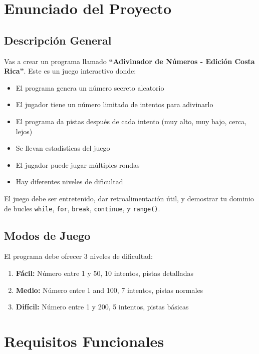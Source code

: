 \documentclass[12pt,a4paper]{article}
\begin{document}
\section{Enunciado del Proyecto}

\subsection{Descripción General}

Vas a crear un programa llamado \textbf{``Adivinador de Números - Edición Costa Rica''}. Este es un juego interactivo donde:

\begin{itemize}
    \item El programa genera un número secreto aleatorio
    \item El jugador tiene un número limitado de intentos para adivinarlo
    \item El programa da pistas después de cada intento (muy alto, muy bajo, cerca, lejos)
    \item Se llevan estadísticas del juego
    \item El jugador puede jugar múltiples rondas
    \item Hay diferentes niveles de dificultad
\end{itemize}

El juego debe ser entretenido, dar retroalimentación útil, y demostrar tu dominio de bucles \texttt{while}, \texttt{for}, \texttt{break}, \texttt{continue}, y \texttt{range()}.

\subsection{Modos de Juego}

El programa debe ofrecer 3 niveles de dificultad:

\begin{enumerate}
    \item \textbf{Fácil:} Número entre 1 y 50, 10 intentos, pistas detalladas
    \item \textbf{Medio:} Número entre 1 and 100, 7 intentos, pistas normales
    \item \textbf{Difícil:} Número entre 1 y 200, 5 intentos, pistas básicas
\end{enumerate}

\section{Requisitos Funcionales}
\end{document}
